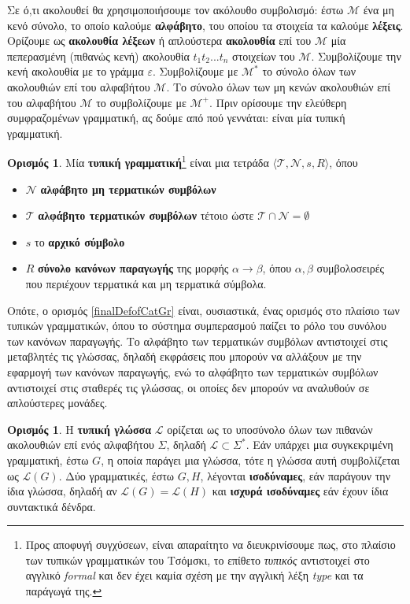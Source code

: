 \documentclass [a4paper,11pt] {book}
\theoremstyle{definition}
\theoremstyle{definition}
\newtheorem{definition}[theorem]{Ορισμός}
\begin{document}
Σε ό,τι ακολουθεί θα χρησιμοποιήσουμε τον ακόλουθο συμβολισμό: έστω $\mathcal{M}$ ένα μη κενό σύνολο, το οποίο καλούμε \textbf{αλφάβητο}, του οποίου τα στοιχεία τα καλούμε \textbf{λέξεις}. Ορίζουμε ως \textbf{ακολουθία λέξεων} ή απλούστερα \textbf{ακολουθία} επί του $\mathcal{M}$ μία πεπερασμένη (πιθανώς κενή) ακολουθία $t_{1}t_{2}...t_{n}$ στοιχείων του $\mathcal{M}$. Συμβολίζουμε την κενή ακολουθία με το γράμμα $\varepsilon$. Συμβολίζουμε με $\mathcal{M}^{*}$ το σύνολο όλων των ακολουθιών επί του αλφαβήτου $\mathcal{M}$. Το σύνολο όλων των μη κενών ακολουθιών επί του αλφαβήτου $\mathcal{M}$ το συμβολίζουμε με $\mathcal{M}^{+}$. Πριν ορίσουμε την ελεύθερη συμφραζομένων γραμματική, ας δούμε από πού γεννάται: είναι μία τυπική γραμματική.
\begin{definition}
Μία \textbf{τυπική γραμματική}\footnote{Προς αποφυγή συγχύσεων, είναι απαραίτητο να διευκρινίσουμε πως, στο πλαίσιο των τυπικών γραμματικών του Τσόμσκι, το επίθετο \textit{τυπικός} αντιστοιχεί στο αγγλικό \textit{formal} και δεν έχει καμία σχέση με την αγγλική λέξη \textit{type} και τα παράγωγά της.} είναι μια τετράδα $\langle \mathcal{T},\mathcal{N},s,R \rangle$, όπου
\begin{itemize}
\item $\mathcal{N}$ \textbf{αλφάβητο μη τερματικών συμβόλων}
\item $\mathcal{T}$ \textbf{αλφάβητο τερματικών συμβόλων} τέτοιο ώστε $\mathcal{T}\cap\mathcal{N}=\emptyset$
\item $s$ το \textbf{αρχικό σύμβολο}
\item $R$ \textbf{σύνολο κανόνων παραγωγής} της μορφής $\alpha\to\beta$, όπου $\alpha,\beta$ συμβολοσειρές που περιέχουν τερματικά και μη τερματικά σύμβολα.
\end{itemize}
\end{definition}
Οπότε, ο ορισμός \ref{finalDefofCatGr} είναι, ουσιαστικά, ένας ορισμός στο πλαίσιο των τυπικών γραμματικών, όπου το σύστημα συμπερασμού παίζει το ρόλο του συνόλου των κανόνων παραγωγής. Το αλφάβητο των τερματικών συμβόλων αντιστοιχεί στις μεταβλητές τις γλώσσας, δηλαδή εκφράσεις που μπορούν να αλλάξουν με την εφαρμογή των κανόνων παραγωγής, ενώ το αλφάβητο των τερματικών συμβόλων αντιστοιχεί στις σταθερές τις γλώσσας, οι οποίες δεν μπορούν να αναλυθούν σε απλούστερες μονάδες.
\begin{definition}
\label{formalLang-Equiv}
Η \textbf{τυπική γλώσσα} $\mathcal{L}$ ορίζεται ως το υποσύνολο όλων των πιθανών ακολουθιών επί ενός αλφαβήτου $\Sigma$, δηλαδή $\mathcal{L}\subset \Sigma^{*}$. Εάν υπάρχει μια συγκεκριμένη γραμματική, έστω $G$, η οποία παράγει μια γλώσσα, τότε η γλώσσα αυτή συμβολίζεται ως $\mathcal{L}(G)$. Δύο γραμματικές, έστω $G,H$, λέγονται \textbf{ισοδύναμες}, εάν παράγουν την ίδια γλώσσα, δηλαδή αν $\mathcal{L}(G)=\mathcal{L}(H)$ και \textbf{ισχυρά ισοδύναμες} εάν έχουν ίδια συντακτικά δένδρα.
\end{definition}
\end{document}
